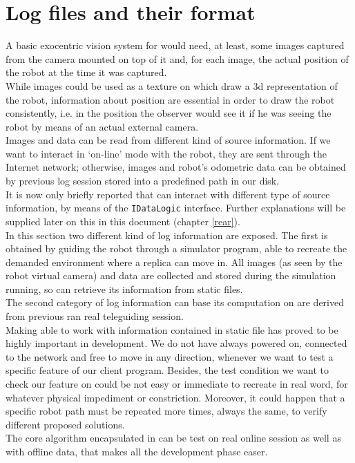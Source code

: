 \setcounter{figure}{0}
\setcounter{table}{0}
\setcounter{lstlisting}{0}

\chapter{Log files and their format}
\label{log}
\minitoc

A basic exocentric vision system for \morduc{} would need, 
at least, some images captured from the camera mounted 
on top of it and, for each image, the actual position of 
the robot at the time it was captured.
\\
While images could be used as a texture on which draw 
a 3d representation of the robot, information about 
position are essential in order to draw the robot 
consistently, i.e. in the position the observer would 
see it if he was seeing the robot by means of an actual 
external camera.
\\
Images and data can be read from different kind of source 
information. If we want to interact in `on-line' mode with
the robot, they are sent through the Internet network;
otherwise, images and robot's odometric data can be
obtained by previous log session stored into a predefined
path in our disk.
\\
It is now only briefly reported that
\framework{} can interact with different type of source
information, by means of the \texttt{IDataLogic} interface.
Further explanations will be supplied later on this in this
document (chapter \ref{rear}).
\\
In this section two different kind of log information are
exposed. The first is obtained by guiding the robot through
a simulator program, able to recreate the demanded environment
where a \morduc{} replica can move in. All images (as seen by
the robot virtual camera) and data are collected and stored
during the simulation running, so \framework{} can retrieve
its information from static files.
\\
The second category of log information \framework{} can base
its computation on are derived from previous ran 
real \morduc{} teleguiding
session.
\\
Making \framework{} able to work with information contained in
static file has proved to be highly important in development.
We do not have \morduc{} always powered on, connected to the
network and free to move in any direction, whenever
we want to test a specific feature of our client program. Besides,
the test condition we want to check our feature on could be not easy
or immediate to recreate in real word, for whatever physical
impediment or constriction. Moreover, it could happen that a specific
robot
path must be repeated more times, always the same, to verify
different proposed solutions.
\\
The core algorithm encapsulated in \framework{} can be test
on real online session as well as with offline data, that 
makes all the development phase easer.


\clearpage


\clearpage

